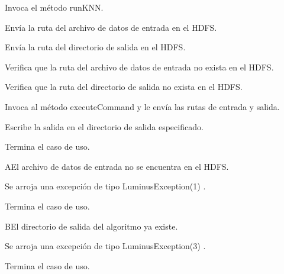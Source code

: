 
	\begin{UCtrayectoria}

		\UCpaso[\UCactor] Invoca el método runKNN.

		\UCpaso[\UCactor] Envía la ruta del archivo de datos de entrada en el HDFS.

		\UCpaso[\UCactor] Envía la ruta del directorio de salida en el HDFS.

		\UCpaso[\UCsist] Verifica que la ruta del archivo de datos de entrada no exista en el HDFS. 

		\UCpaso[\UCsist] Verifica que la ruta del directorio de salida no exista en el HDFS. 

		\UCpaso[\UCsist] Invoca al método executeCommand y le envía las rutas de entrada y salida.

		\UCpaso[\UCsist] Escribe la salida en el directorio de salida especificado.

		\UCpaso[] Termina el caso de uso.

	\end{UCtrayectoria}

	\begin{UCtrayectoriaA}{A}{El archivo de datos de entrada no se encuentra en el HDFS.}

		\UCpaso[\UCsist] Se arroja una excepción de tipo LuminusException(1) .

		\UCpaso[] Termina el caso de uso.

	\end{UCtrayectoriaA}

	\begin{UCtrayectoriaA}{B}{El directorio de salida del algoritmo ya existe.}

		\UCpaso[\UCsist] Se arroja una excepción de tipo LuminusException(3) .

		\UCpaso[] Termina el caso de uso.

	\end{UCtrayectoriaA}



